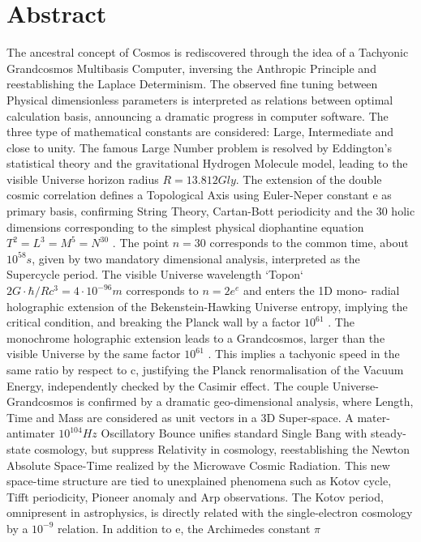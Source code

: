 
\chapter*{Abstract}
\vspace{-40pt}
The ancestral concept of Cosmos is rediscovered through the idea of a Tachyonic
Grandcosmos Multibasis Computer, inversing the Anthropic Principle and reestablishing
the Laplace Determinism. The observed fine tuning between Physical dimensionless
parameters is interpreted as relations between optimal calculation basis, announcing a
dramatic progress in computer software. The three type of mathematical constants are
considered: Large, Intermediate and close to unity. The famous Large Number problem is
resolved by Eddington's statistical theory and the gravitational Hydrogen Molecule model,
leading to the visible Universe horizon radius $ R = 13.812 Gly $. The extension of
the double cosmic correlation defines a Topological Axis using Euler-Neper constant e as
primary basis, confirming String Theory, Cartan-Bott periodicity and the 30 holic
dimensions corresponding to the simplest physical diophantine equation $T^2 = L^3 = M^5 =
N^{30}$ . The point $n = 30$ corresponds to the common time, about $10^{58} s$, given by two
mandatory dimensional analysis, interpreted as the Supercycle period. The visible Universe
wavelength `Topon` $2G \cdot \hbar / Rc^3 = 4 \cdot 10^{-96} m$ corresponds to $n = 2e^e$ and enters the 1D mono-
radial holographic extension of the Bekenstein-Hawking Universe entropy, implying the
critical condition, and breaking the Planck wall by a factor $10^{61}$ . The monochrome
holographic extension leads to a Grandcosmos, larger than the visible Universe by the
same factor $10^{61}$ . This implies a tachyonic speed in the same ratio by respect to c, justifying
the Planck renormalisation of the Vacuum Energy, independently checked by the Casimir
effect. The couple Universe-Grandcosmos is confirmed by a dramatic geo-dimensional
analysis, where Length, Time and Mass are considered as unit vectors in a 3D Super-space.
A mater-antimater $ 10^104 Hz$ Oscillatory Bounce unifies standard Single Bang with steady-
state cosmology, but suppress Relativity in cosmology, reestablishing the Newton Absolute
Space-Time realized by the Microwave Cosmic Radiation. This new space-time structure are
tied to unexplained phenomena such as Kotov cycle, Tifft periodicity, Pioneer anomaly and
Arp observations. The Kotov period, omnipresent in astrophysics, is directly related with the
single-electron cosmology by a $10^{-9}$ relation. In addition to e, the Archimedes constant $\pi$
